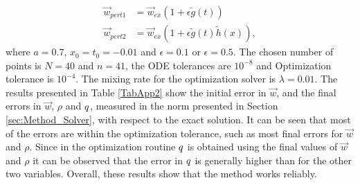 \begin{align*}
\vec{w}_{pert1} &= \vec{w}_{ex}(1+ \epsilon \tilde g(t))\\
\vec{w}_{pert2} &= \vec{w}_{ex}(1+ \epsilon \tilde g(t) \tilde h(x)),
\end{align*}
where $a = 0.7$, $x_0 = t_0 = -0.01$ and $\epsilon = 0.1$ or $\epsilon = 0.5$.
The chosen number of points is $N =40$ and $n=41$, the ODE tolerances are $10^{-8}$ and Optimization tolerance is $10^{-4}$. The mixing rate for the optimization solver is $\lambda = 0.01$.
The results presented in Table \ref{TabApp2} show the initial error in $\vec{w}$, and the final errors in $\vec{w}$, $\rho$ and $q$, measured in the norm presented in Section \ref{sec:Method_Solver}, with respect to the exact solution. It can be seen that most of the errors are within the optimization tolerance, such as most final errors for $\vec{w}$ and $\rho$. Since in the optimization routine $q$ is obtained using the final values of $\vec{w}$ and $\rho$ it can be observed that the error in $q$ is generally higher than for the other two variables. Overall, these results show that the method works reliably.



